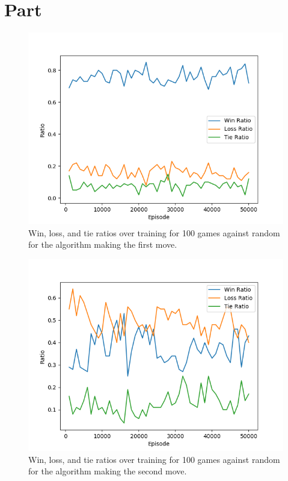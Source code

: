 \documentclass{article}
\newcommand{\enterproblemHeader}[1]{
}
\newcommand{\exitproblemHeader}[1]{
}
\newcounter{problem} %
\newcommand{\problemName}{}
\newenvironment{problem}[1][Part \theproblem]{ %
	\stepcounter{problem} %
	\renewcommand{\problemName}{#1} %
	\section{\problemName} %
	\enterproblemHeader{\problemName} %
}{
	\exitproblemHeader{\problemName} %
}
\begin{document}
\begin{problem}
\begin{figure}
		\includegraphics[width=\linewidth]{bonus_b_winrate_first.png}
		\caption{Win, loss, and tie ratios over training for 100 games against random for the algorithm making the first move.}
		\label{b winrate first}
\end{figure}

\begin{figure}
		\includegraphics[width=\linewidth]{bonus_a_win_rate_second.png}
		\caption{Win, loss, and tie ratios over training for 100 games against random for the algorithm making the second move.}
		\label{b winrate second}
\end{figure}



\end{problem}
\end{document}
